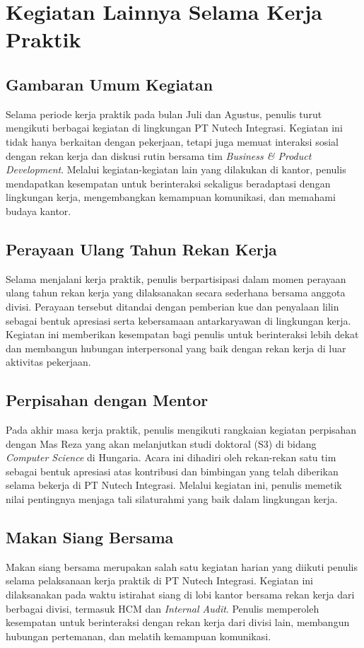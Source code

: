\cleardoublepage
\chapter{Kegiatan Lainnya Selama Kerja Praktik}
\label{chap:kegiatan-lainnya}

\section{Gambaran Umum Kegiatan}
Selama periode kerja praktik pada bulan Juli dan Agustus, penulis turut mengikuti berbagai kegiatan di lingkungan PT Nutech Integrasi. Kegiatan ini tidak hanya berkaitan dengan pekerjaan, tetapi juga memuat interaksi sosial dengan rekan kerja dan diskusi rutin bersama tim \textit{Business \& Product Development}. Melalui kegiatan-kegiatan lain yang dilakukan di kantor, penulis mendapatkan kesempatan untuk berinteraksi sekaligus beradaptasi dengan lingkungan kerja, mengembangkan kemampuan komunikasi, dan memahami budaya kantor.

\section{Perayaan Ulang Tahun Rekan Kerja}
Selama menjalani kerja praktik, penulis berpartisipasi dalam momen perayaan ulang tahun rekan kerja yang dilaksanakan secara sederhana bersama anggota divisi. Perayaan tersebut ditandai dengan pemberian kue dan penyalaan lilin sebagai bentuk apresiasi serta kebersamaan antarkaryawan di lingkungan kerja. Kegiatan ini memberikan kesempatan bagi penulis untuk berinteraksi lebih dekat dan membangun hubungan interpersonal yang baik dengan rekan kerja di luar aktivitas pekerjaan.

\section{Perpisahan dengan Mentor}
Pada akhir masa kerja praktik, penulis mengikuti rangkaian kegiatan perpisahan dengan Mas Reza yang akan melanjutkan studi doktoral (S3) di bidang \textit{Computer Science} di Hungaria. Acara ini dihadiri oleh rekan-rekan satu tim sebagai bentuk apresiasi atas kontribusi dan bimbingan yang telah diberikan selama bekerja di PT Nutech Integrasi. Melalui kegiatan ini, penulis memetik nilai pentingnya menjaga tali silaturahmi yang baik dalam lingkungan kerja.

\section{Makan Siang Bersama}
Makan siang bersama merupakan salah satu kegiatan harian yang diikuti penulis selama pelaksanaan kerja praktik di PT Nutech Integrasi. Kegiatan ini dilaksanakan pada waktu istirahat siang di lobi kantor bersama rekan kerja dari berbagai divisi, termasuk HCM dan \textit{Internal Audit}. Penulis memperoleh kesempatan untuk berinteraksi dengan rekan kerja dari divisi lain, membangun hubungan pertemanan, dan melatih kemampuan komunikasi.

